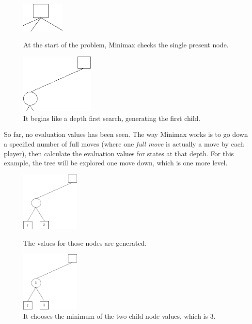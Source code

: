 \begin{figure}[H]
\centering
	\begin{minipage}[b]{0.45\linewidth}
		\centering
		\includegraphics[height=1.5cm]{3Algorithms/3.2Algorithm_MCTS_Benoit/img/Minimax2.png}
		\caption{\label{fig:Minimax2}At the start of the problem, Minimax checks the single present node.}
	\end{minipage}%
	\hspace*{1cm}
	\begin{minipage}[b]{0.45\linewidth}
		\centering
		\includegraphics[height=3cm]{3Algorithms/3.2Algorithm_MCTS_Benoit/img/Minimax3.png}
		\caption{\label{fig:Minimax3}It begins like a depth first search, generating the first child.}
	\end{minipage}%
\end{figure}

So far, no evaluation values has been seen. The way Minimax works is to go down a specified number of full moves (where one \emph{full move} is actually a move by each player), then calculate the evaluation values for states at that depth. For this example, the tree will be explored one move down, which is one more level.
\begin{figure}[H]
\centering
	\begin{minipage}[b]{0.45\linewidth}
		\centering
		\includegraphics[height=3cm]{3Algorithms/3.2Algorithm_MCTS_Benoit/img/Minimax4.png}
		\caption{\label{fig:Minimax4}The values for those nodes are generated.}
	\end{minipage}%
	\hspace*{1cm}
	\begin{minipage}[b]{0.45\linewidth}
		\centering
		\includegraphics[height=3cm]{3Algorithms/3.2Algorithm_MCTS_Benoit/img/Minimax5.png}
		\caption{\label{fig:Minimax5}It chooses the minimum of the two child node values, which is 3.}
	\end{minipage}%
\end{figure}

